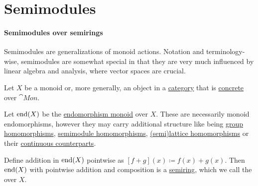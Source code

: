 \section{Semimodules}\label{sec:semimodules}

\paragraph{Semimodules over semirings}

Semimodules are generalizations of monoid actions. Notation and terminology-wise, semimodules are somewhat special in that they are very much influenced by linear algebra and analysis, where vector spaces are crucial.

\begin{definition}\label{def:endomorphism_semiring}\mimprovised
  Let \( X \) be a monoid or, more generally, an object in a \hyperref[def:category]{category} that is \hyperref[def:concrete_category]{concrete} over \hyperref[def:monoid/category]{\( \cat{Mon} \)}.

  Let \( \operatorname{end}(X) \) be the \hyperref[def:endomorphism_monoid]{endomorphism monoid} over \( X \). These are necessarily monoid endomorphisms, however they may carry additional structure like being \hyperref[def:group/homomorphism]{group homomorphisms}, \hyperref[def:semimodule/homomorphism]{semimodule homomorphisms}, \hyperref[def:lattice/homomorphism]{(semi)lattice homomorphisms} or their \hyperref[rem:topological_first_order_structures]{continuous counterparts}.

  Define addition in \( \operatorname{end}(X) \) pointwise as \( [f + g](x) \coloneqq f(x) + g(x) \). Then \( \operatorname{end}(X) \) with pointwise addition and composition is a \hyperref[def:semiring]{semiring}, which we call the  over \( X \).
\end{definition}

